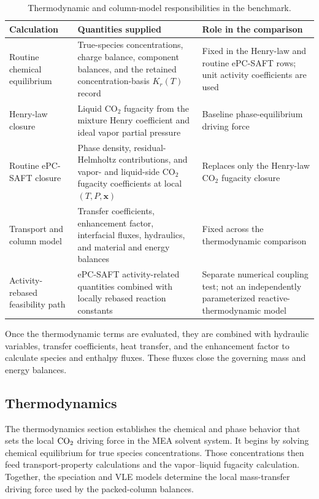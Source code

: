         \begin{table}[htbp]
            \centering
            \caption{Thermodynamic and column-model responsibilities in the benchmark.}
            \label{tab:thermodynamic-responsibility}
            \begin{tabularx}{\textwidth}{p{} X X}
                \toprule
                Calculation & Quantities supplied & Role in the comparison \\
                \midrule
                Routine chemical equilibrium & True-species concentrations, charge balance, component balances, and the retained concentration-basis $K_r(T)$ record & Fixed in the Henry-law and routine ePC-SAFT rows; unit activity coefficients are used \\
                Henry-law closure & Liquid CO$_2$ fugacity from the mixture Henry coefficient and ideal vapor partial pressure & Baseline phase-equilibrium driving force \\
                Routine ePC-SAFT closure & Phase density, residual-Helmholtz contributions, and vapor- and liquid-side CO$_2$ fugacity coefficients at local $(T,P,\mathbf{x})$ & Replaces only the Henry-law CO$_2$ fugacity closure \\
                Transport and column model & Transfer coefficients, enhancement factor, interfacial fluxes, hydraulics, and material and energy balances & Fixed across the thermodynamic comparison \\
                Activity-rebased feasibility path & ePC-SAFT activity-related quantities combined with locally rebased reaction constants & Separate numerical coupling test; not an independently parameterized reactive-thermodynamic model \\
                \bottomrule
            \end{tabularx}
        \end{table}

        Once the thermodynamic terms are evaluated, they are combined with hydraulic variables, transfer coefficients, heat transfer, and the enhancement factor to calculate species and enthalpy fluxes. These fluxes close the governing mass and energy balances.

        \subsection{Thermodynamics}\label{subsec:thermodynamics}
            The thermodynamics section establishes the chemical and phase behavior that sets the local $\COtwo$ driving force in the MEA solvent system. It begins by solving chemical equilibrium for true species concentrations. Those concentrations then feed transport-property calculations and the vapor--liquid fugacity calculation. Together, the speciation and VLE models determine the local mass-transfer driving force used by the packed-column balances.

